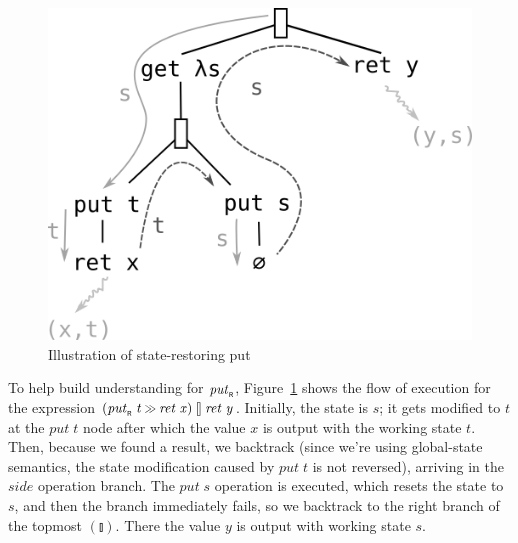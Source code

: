 \documentclass{jfp}
\newcommand{\Varid}[1]{\mathit{#1}}
\let\Varid\mathit
\begin{document}
\begin{figure}
  \centering
  \includegraphics[scale=0.7]{sections/putR}
  \caption{Illustration of state-restoring put}
  \label{fig:putR}
\end{figure}

To help build understanding for \ensuremath{\Varid{put}_{\scaleobj{0.7}{\sf R}}}, Figure~\ref{fig:putR} shows the flow of
execution for the expression \ensuremath{(\Varid{put}_{\scaleobj{0.7}{\sf R}}\;\Varid{t}\mathbin{\hstretch{0.7}{>\!\!>}}\Varid{ret}\;\Varid{x})\mathbin{\talloblong}\Varid{ret}\;\Varid{y}}. Initially, the
state is \ensuremath{\Varid{s}}; it gets modified to \ensuremath{\Varid{t}} at the \ensuremath{\Varid{put}\;\Varid{t}} node after which the value
\ensuremath{\Varid{x}} is output with the working state \ensuremath{\Varid{t}}. Then, because we found a result, we
backtrack (since we're using global-state semantics, the state modification
caused by \ensuremath{\Varid{put}\;\Varid{t}} is not reversed), arriving in the \ensuremath{\Varid{side}} operation branch. The
\ensuremath{\Varid{put}\;\Varid{s}} operation is executed, which resets the state to \ensuremath{\Varid{s}}, and then the
branch immediately fails, so we backtrack to the right branch of the topmost
\ensuremath{(\talloblong)}. There the value \ensuremath{\Varid{y}} is output with working state \ensuremath{\Varid{s}}.
\end{document}
